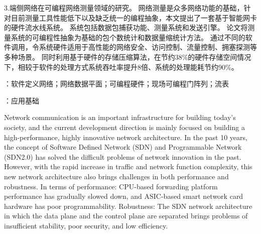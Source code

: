 3.端侧网络在可编程网络测量领域的研究。
网络测量是众多网络功能的基础，针对目前测量工具性能低下以及缺乏统一的编程抽象，本文提出了一套基于智能网卡的硬件流水线系统。
系统包括数据包捕获功能、测量系统和发送引擎。
论文将测量系统的可编程性抽象为基础的包个数统计和数据量缩统计方法。
通过不同的软件调用，令系统硬件适用于高性能的网络安全、访问控制、流量控制、拥塞探测等多种场景。
同时利用基于硬件的存储压缩算法，在节约38\%的硬件存储空间情况下，相较于软件的处理方式系统吞吐率提升8倍、系统的处理能耗节约90\%。



{\boldsong}
\vspace{\baselineskip}
：软件定义网络；网络数据平面；可编程硬件；现场可编程门阵列；流表

\vspace{\baselineskip}
：应用基础


\clearpage


%

\noindent Network communication is an important infrastructure for building today's society, and the current development direction is mainly focused on building a high-performance, highly innovative network architecture. In the past 10 years, the concept of Software Defined Network (SDN) and Programmable Network (SDN2.0) has solved the difficult problems of network innovation in the past. However, with the rapid increase in traffic and network function complexity, this new network architecture also brings challenges in both performance and robustness. In terms of performance: CPU-based forwarding platform performance has gradually slowed down, and ASIC-based smart network card hardware has poor programmability. Robustness: The SDN network architecture in which the data plane and the control plane are separated brings problems of insufficient stability, poor security, and low efficiency.\newline

